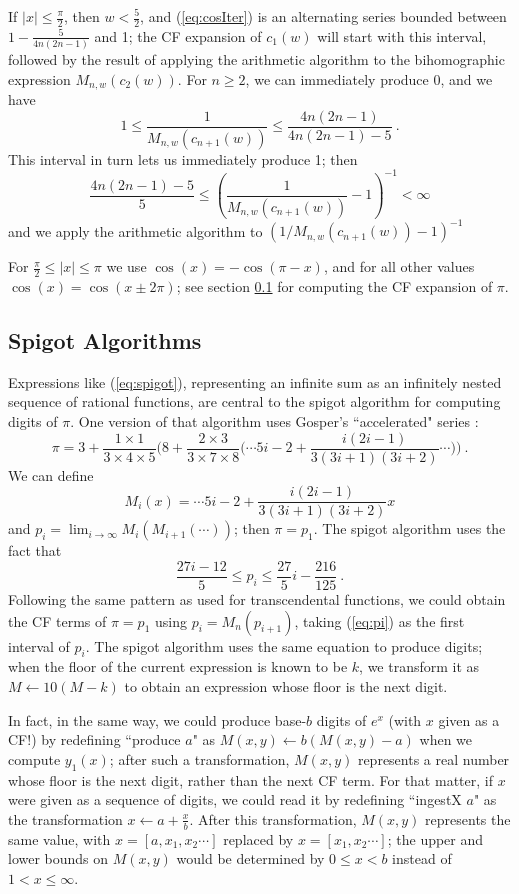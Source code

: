\documentclass[11pt, oneside]{amsart}   	%
\renewcommand{\:}{\negthickspace:\negthickspace}
\begin{document}
If $|x| \leq \frac{\pi}{2}$, then $w < \frac{5}{2}$, and (\ref{eq:cosIter}) is an alternating series bounded between $1 - \frac{5}{4n(2n-1)}$ and 1; the CF expansion of $c_1(w)$ will start with this interval,  followed by the result of applying the arithmetic algorithm to the bihomographic expression $M_{n,w}(c_2(w))$. For $n \geq 2$, we can immediately produce 0, and we have
\[
1  \leq \frac{1}{M_{n,w}(c_{n+1}(w))} \leq \frac{4n(2n-1)}{4n(2n-1)-5} \ .
\]
This interval in turn lets us immediately produce 1; then
\[
 \frac{4n(2n-1)-5}{5} \leq \left(\frac{1}{M_{n,w}(c_{n+1}(w))} - 1 \right)^{-1} < \infty
\]
and we apply the arithmetic algorithm to $(1/M_{n,w}(c_{n+1}(w)) - 1) ^{-1}$

For $\frac{\pi}{2} \leq |x| \leq \pi$ we use $\cos(x) = -\cos(\pi - x)$, and for all other values $\cos(x) = \cos(x \pm 2\pi)$; see section \ref{sec:spigot} for computing the CF expansion of $\pi$.


\subsection{Spigot Algorithms}\label{sec:spigot}
Expressions like (\ref{eq:spigot}), representing an infinite sum as an infinitely nested sequence of rational functions, are central to the spigot algorithm\cite{Gibbons2016,Rabinowitz2016} for computing digits of $\pi$. One version of that algorithm uses Gosper's ``accelerated" series \cite{acceleration}:
\[
\pi = 3 + \frac{1 \times 1}{3 \times 4 \times 5}\big(8 + \frac{2 \times 3}{3 \times 7 \times 8}\big( \cdots 5i-2 + \frac{i(2i-1)}{3(3i+1)(3i+2)} \cdots \big) \big) \ .
\]
We can define
\[
M_i(x) = \cdots 5i-2 + \frac{i(2i-1)}{3(3i+1)(3i+2)}x
\]
and $p_i = \lim_{i \to \infty} M_i(M_{i+1}(\cdots))$;
then $\pi = p_1$. The spigot algorithm uses the fact that
\begin{equation}\label{eq:pi}
\frac{27i-12}{5} \leq p_i \leq \frac{27}{5}i - \frac{216}{125} \ .
\end{equation}
Following the same pattern as used for transcendental functions, we could obtain the CF terms of $\pi = p_1$ using $p_i = M_n(p_{i+1})$, taking (\ref{eq:pi}) as the first interval of $p_i$. The spigot algorithm uses the same equation to produce digits; when the floor of the current expression is known to be $k$, we transform it as $M \leftarrow 10(M-k)$ to obtain an expression whose floor is the next digit.

In fact, in the same way, we could produce base-$b$ digits of $e^x$ (with $x$ given as a CF!) by redefining ``produce $a$" as $M(x,y) \leftarrow b(M(x,y) - a)$ when we compute $y_1(x)$;
after such a transformation, $M(x,y)$ represents a real number whose floor is the next digit, rather than the next CF term. 
For that matter, if $x$ were given as a sequence of digits, we could read it by redefining ``ingestX $a$" as the transformation $x \leftarrow a + \frac{x}{b}$. After this transformation, $M(x,y)$ represents the same value, with $x=[a,x_1,x_2\cdots]$ replaced by $x=[x_1,x_2\cdots]$; the upper and lower bounds on $M(x,y)$ would be determined by $0 \leq x < b$ instead of $1 <  x \leq \infty$.
\end{document}
